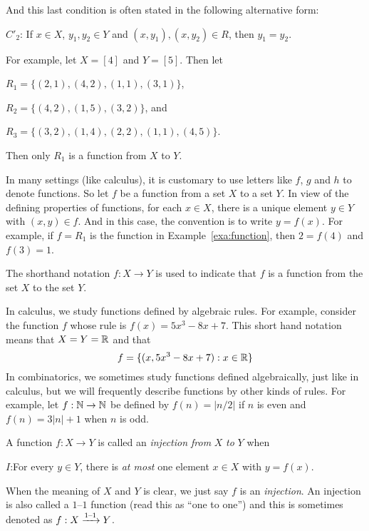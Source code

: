 \medskip
And this last condition is often stated in the following alternative
form:

\medskip
\noindent
$C'_2$: \quad If $x\in X$, $y_1,y_2\in Y$ and $(x,y_1),(x,y_2)\in R$, then
$y_1=y_2$.

\begin{example}\label{exa:function}

For example, let $X=[4]$ and $Y=[5]$.  Then let

$R_1=\{(2,1),(4,2),(1,1),(3,1)\}$, 

$R_2=\{(4,2),(1,5),(3,2)\}$, and 

$R_3=\{(3,2),(1,4),(2,2),(1,1),(4,5)\}$.

\noindent
Then only $R_1$ is a function from $X$ to $Y$.
\end{example}

In many settings (like calculus), it is customary to use letters like $f$,
$g$ and $h$ to denote functions.  So let $f$ be a function from a
set $X$ to a set $Y$. In view of the defining properties of functions, for
each $x\in X$, there is a unique element $y\in Y$ with $(x,y)\in f$.
And in this case, the convention is to write $y=f(x)$.  For example,
if $f=R_1$ is the function in Example~\ref{exa:function}, then
$2=f(4)$ and $f(3) =1$.

The shorthand notation $f:X\rightarrow Y$ is used to indicate
that $f$ is a function from the set $X$ to the set $Y$.  

In calculus, we study functions defined by algebraic rules.
For example, consider the function $f$ whose rule is $f(x) = 5x^3-8x+7$.
This short hand notation means that $X=Y=\mathbb{R}$ and that
\[
f=\{(x,5x^3-8x+7):x\in\mathbb{R}\}
\]
In combinatorics, we sometimes study functions defined
algebraically, just like in calculus, but we will frequently
describe functions by other kinds of rules.  For example, let
$f:\mathbb{N}\rightarrow\mathbb{N}$ be defined by
$f(n) = |n/2|$ if $n$ is even and $f(n)=3|n|+1$ when $n$ is odd.

A function $f:X\rightarrow Y$ is
called an \textit{injection from} $X$ \textit{to} $Y$ when

\medskip
\noindent
$I$:\quad For every $y\in Y$, there is \textit{at most} one element 
$x\in X$ with $y=f(x)$.

\medskip
When the meaning of $X$ and $Y$ is clear, we just say $f$ is an 
\textit{injection}.  An injection is also called a $1$--$1$ function
(read this as ``one to one'') and this is sometimes denoted as
$f:X\xrightarrow[]{\text{$1$--$1$}} Y$.

